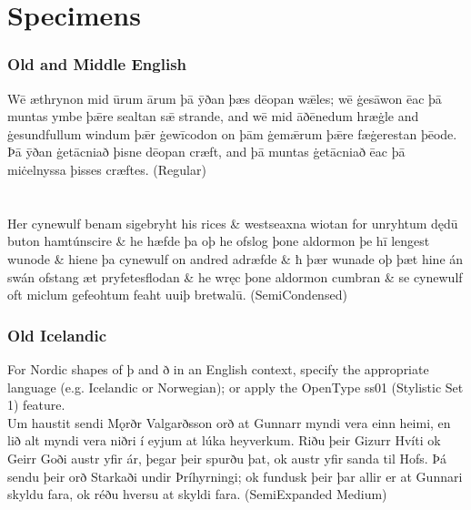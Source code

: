 \documentclass[12pt,letterpaper,openany]{book}
\begin{document}
\hypertarget{specimens}{}\chapter*{\color{RViolet}Specimens}

\subsection*{Old and Middle English}

{\noindent\regular{}Wē æthrynon mid ūrum ārum þā ȳðan þæs dēopan wǣles; wē
ġesāwon ēac þā muntas ymbe þǣre sealtan sǣ strande, and wē mid
āðēnedum hræġle and ġesundfullum windum þǣr ġewīcodon on þām
ġemǣrum þǣre fæġerestan þēode. Þā ȳðan ġetācniað þisne dēopan
cræft, and þā muntas ġetācniað ēac þā miċelnyssa þisses cræftes. (Regular)}\\

\\

\\[1ex]
{\seminarrow{}
Her cynewulf benam sigebryht his rices \& westseaxna wiotan for
un\-ryht\-um dędū buton hamtúnscire \& he hæfde þa oþ he ofslog
þone aldormon þe hī lengest wunode \& hiene þa cynewulf on
andred adræfde \& ħ þær wunade oþ þæt hine án swán ofstang
æt pryfetesflodan \& he wręc þone aldormon cumbran \& se cynewulf
oft miclum gefeohtum feaht uuiþ bretwalū.} (SemiCondensed)

\subsection*{Old Icelandic}
{\small\semiconditalic{} For Nordic shapes of þ and ð in an
English context, specify the appropriate language (e.g. Icelandic or Norwegian);
or apply the OpenType ss01 (Stylistic Set 1) feature.}\\[1ex]
{\medium Um haustit sendi Mǫrðr Valgarðsson orð at Gunnarr myndi vera einn heimi, en
lið alt myndi vera niðri í eyjum at lúka heyverkum. Riðu þeir Gizurr Hvíti ok
Geirr Goði austr yfir ár, þegar þeir spurðu þat, ok austr yfir sanda til Hofs.
Þá sendu þeir orð Starkaði undir Þríhyrningi; ok fundusk þeir þar allir er at
Gunnari skyldu fara, ok réðu hversu at skyldi fara. (SemiExpanded Medium)}
\end{document}

